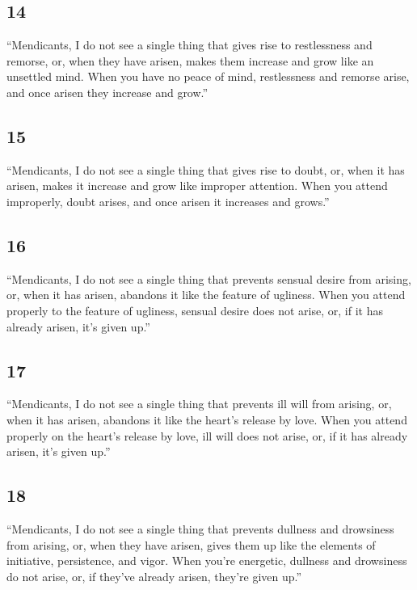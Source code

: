 \documentclass[12pt,openany]{book}%
\begin{document}
\subsection*{14 }

“Mendicants, I do not see a single thing that gives rise to restlessness and remorse, or, when they have arisen, makes them increase and grow like an unsettled mind. When you have no peace of mind, restlessness and remorse arise, and once arisen they increase and grow.” 

\subsection*{15 }

“Mendicants, I do not see a single thing that gives rise to doubt, or, when it has arisen, makes it increase and grow like improper attention. When you attend improperly, doubt arises, and once arisen it increases and grows.” 

\subsection*{16 }

“Mendicants, I do not see a single thing that prevents sensual desire from arising, or, when it has arisen, abandons it like the feature of ugliness. When you attend properly to the feature of ugliness, sensual desire does not arise, or, if it has already arisen, it’s given up.” 

\subsection*{17 }

“Mendicants, I do not see a single thing that prevents ill will from arising, or, when it has arisen, abandons it like the heart’s release by love. When you attend properly on the heart’s release by love, ill will does not arise, or, if it has already arisen, it’s given up.” 

\subsection*{18 }

“Mendicants, I do not see a single thing that prevents dullness and drowsiness from arising, or, when they have arisen, gives them up like the elements of initiative, persistence, and vigor. When you’re energetic, dullness and drowsiness do not arise, or, if they’ve already arisen, they’re given up.” 
\end{document}
